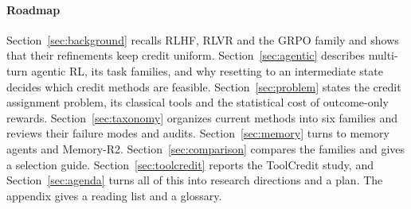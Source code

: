 \paragraph{Roadmap}
Section~\ref{sec:background} recalls RLHF, RLVR and the GRPO family and shows that their refinements keep credit uniform. Section~\ref{sec:agentic} describes multi-turn agentic RL, its task families, and why resetting to an intermediate state decides which credit methods are feasible. Section~\ref{sec:problem} states the credit assignment problem, its classical tools and the statistical cost of outcome-only rewards. Section~\ref{sec:taxonomy} organizes current methods into six families and reviews their failure modes and audits. Section~\ref{sec:memory} turns to memory agents and Memory-R2. Section~\ref{sec:comparison} compares the families and gives a selection guide. Section~\ref{sec:toolcredit} reports the ToolCredit study, and Section~\ref{sec:agenda} turns all of this into research directions and a plan. The appendix gives a reading list and a glossary.
